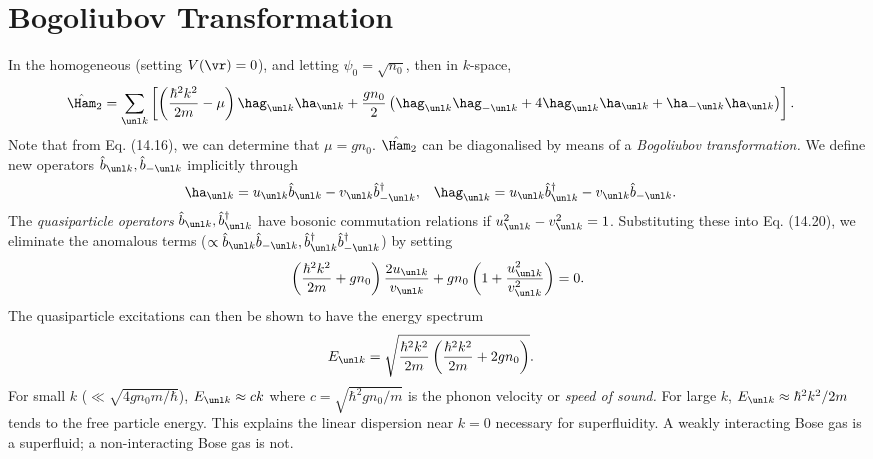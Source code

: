 \documentclass[qo.tex]{subfiles}
\begin{document}
\section{Bogoliubov Transformation}
In the homogeneous (setting $V(\vr)=0$), and letting $\psi_0=\sqrt{n_0}$, then in $k$-space,
\begin{align}
    \hat{\Ham}_2 &= \sum_{\vk}\left[\left(\frac{\hbar^2k^2}{2m}-\mu\right)\hag_{\vk}\ha_{\vk} + \frac{gn_0}{2}\left(\hag_{\vk}\hag_{-\vk} + 4\hag_{\vk}\ha_{\vk} + \ha_{-\vk}\ha_{\vk}\right)\right].
\end{align}
Note that from Eq. (14.16), we can determine that $\mu=gn_0$.
$\hat{\Ham}_2$ can be diagonalised by means of a \emph{Bogoliubov transformation.}
We define new operators $\hat{b}_{\vk},\hat{b}_{-\vk}$ implicitly through
\begin{align}
    \ha_{\vk} &= u_{\vk}\hat{b}_{\vk} - v_{\vk}\hat{b}^\dagger_{-\vk}, & \hag_{\vk} &= u_{\vk}\hat{b}^\dagger_{\vk} - v_{\vk}\hat{b}_{-\vk}.
\end{align}
The \emph{quasiparticle operators} $\hat{b}_{\vk},\hat{b}^\dagger_{\vk}$ have bosonic commutation relations if $u_{\vk}^2-v_{\vk}^2=1$.
Substituting these into Eq. (14.20), we eliminate the anomalous terms ($\propto \hat{b}_{\vk}\hat{b}_{-\vk},\hat{b}^\dagger_{\vk}\hat{b}^\dagger_{-\vk}$) by setting
\begin{align}
    \left(\frac{\hbar^2k^2}{2m}+gn_0\right) \frac{2u_{\vk}}{v_{\vk}} + gn_0\left(1+\frac{u_{\vk}^2}{v_{\vk}^2}\right) = 0.
\end{align}
The quasiparticle excitations can then be shown to have the energy spectrum
\begin{align}
    E_{\vk} &= \sqrt{\frac{\hbar^2k^2}{2m}\left(\frac{\hbar^2k^2}{2m}+2gn_0\right)}.
\end{align}
For small $k$ ($\ll\sqrt{4gn_0m/\hbar}$), $E_{\vk}\approx ck$ where $c=\sqrt{\hbar^2gn_0/m}$ is the phonon velocity or \emph{speed of sound.}
For large $k$, $E_{\vk}\approx \hbar^2k^2/2m$ tends to the free particle energy. 
This explains the linear dispersion near $k=0$ necessary for superfluidity. 
A weakly interacting Bose gas is a superfluid; a non-interacting Bose gas is not. 
\end{document}

